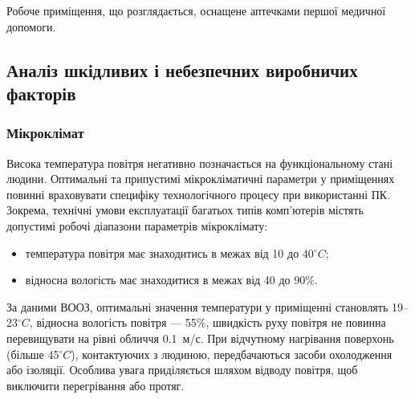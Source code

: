 \documentclass[simple,14pt,utf8,ukrainian]{eskdtext}
\begin{document}
    Робоче приміщення, що розглядається, оснащене аптечками першої медичної
    допомоги.

  \subsection{Аналіз шкідливих і небезпечних виробничих факторів}
    \subsubsection{Мікроклімат}
      Висока температура повітря негативно позначається на функціональному
      стані людини.
      Оптимальні та припустимі мікрокліматичні параметри у приміщеннях повинні
      враховувати специфіку технологічного процесу при використанні ПК.
      Зокрема, технічні умови експлуатації багатьох типів комп’ютерів містять
      допустимі робочі діапазони параметрів мікроклімату:
      \begin{itemize}
        \item температура повітря має знаходитись в межах від \num{10} до
          \num{40}$^\circ C$;
        \item відносна вологість має знаходитися в межах від \num{40} до
          \num{90}\%.
      \end{itemize}

      За даними ВООЗ, оптимальні значення температури у приміщенні становлять
      \num{19}--\num{23}$^\circ C$, відносна вологість повітря --- \num{55}\%,
      швидкість руху повітря не повинна перевищувати на рівні обличчя
      \num{0.1}~м/с.
      При відчутному нагрівання поверхонь (більше \num{45}$^\circ C$),
      контактуючих з людиною, передбачаються засоби охолодження або ізоляції.
      Особлива увага приділяється шляхом відводу повітря, щоб виключити
      перегрівання або протяг.
\end{document}

